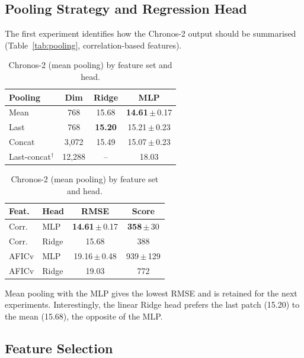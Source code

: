 \documentclass{svproc}
\begin{document}
\subsection{Pooling Strategy and Regression Head}

The first experiment identifies how the Chronos-2 output should be
summarised (Table~\ref{tab:pooling}, correlation-based features).

\begin{table}[t]
\centering\small
\begin{minipage}[t]{0.48\textwidth}\centering
\caption{Chronos-2 RMSE by pooling and head (correlation features).
$^\dagger$Single run.}
\label{tab:pooling}
\begin{tabular}{@{}lccc@{}}
\toprule
\textbf{Pooling} & \textbf{Dim} & \textbf{Ridge} & \textbf{MLP} \\
\midrule
Mean        & 768    & 15.68 & \textbf{14.61}\,$\pm$\,0.17 \\
Last        & 768    & \textbf{15.20} & 15.21\,$\pm$\,0.23 \\
Concat      & 3,072  & 15.49 & 15.07\,$\pm$\,0.23 \\
Last-concat$^\dagger$ & 12,288 & -- & 18.03 \\
\bottomrule
\end{tabular}
\end{minipage}\hfill
\begin{minipage}[t]{0.48\textwidth}\centering
\caption{Chronos-2 (mean pooling) by feature set and head.}
\label{tab:results}
\begin{tabular}{@{}llcc@{}}
\toprule
\textbf{Feat.} & \textbf{Head} & \textbf{RMSE} & \textbf{Score} \\
\midrule
Corr. & MLP   & \textbf{14.61}\,$\pm$\,0.17 & \textbf{358}\,$\pm$\,30 \\
Corr. & Ridge & 15.68 & 388 \\
\midrule
AFICv & MLP   & 19.16\,$\pm$\,0.48 & 939\,$\pm$\,129 \\
AFICv & Ridge & 19.03 & 772 \\
\bottomrule
\end{tabular}
\end{minipage}
\end{table}

Mean pooling with the MLP gives the lowest RMSE and is retained for the
next experiments. Interestingly, the linear Ridge head prefers the
last patch (15.20) to the mean (15.68), the opposite of the MLP.

\subsection{Feature Selection}
\end{document}

